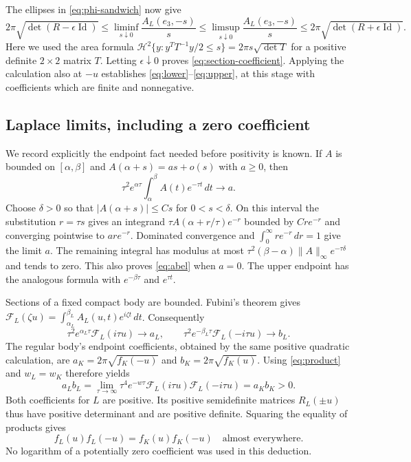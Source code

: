 \documentclass[11pt,a4paper]{article}
\theoremstyle{definition}
\theoremstyle{remark}
\newcommand{\area}{\mathcal H^2}
\newcommand{\F}{\mathcal F}
\newcommand{\id}{\operatorname{Id}}
\numberwithin{equation}{section}
\begin{document}
The ellipses in \eqref{eq:phi-sandwich} now give
\[
 2\pi\sqrt{\det(R-\epsilon\id)}
 \le \liminf_{s\downarrow0}\frac{A_L(e_3,-s)}s
 \le \limsup_{s\downarrow0}\frac{A_L(e_3,-s)}s
 \le2\pi\sqrt{\det(R+\epsilon\id)} .
\]
Here we used the area formula
$\area\{y:y^TT^{-1}y/2\le s\}=2\pi s\sqrt{\det T}$
for a positive definite $2\times2$ matrix $T$.
Letting $\epsilon\downarrow0$ proves \eqref{eq:section-coefficient}.
Applying the calculation also at $-u$ establishes
\eqref{eq:lower}--\eqref{eq:upper}, at this stage with coefficients
which are finite and nonnegative.

\subsection{Laplace limits, including a zero coefficient}\label{app:laplace}
We record explicitly the endpoint fact needed before positivity is known.
If $A$ is bounded on $[\alpha,\beta]$ and
$A(\alpha+s)=as+o(s)$ with $a\ge0$, then
\begin{equation}\label{eq:abel}
 \tau^2 e^{\alpha\tau}
 \int_\alpha^\beta A(t)e^{-\tau t}\,dt\longrightarrow a .
\end{equation}
Choose $\delta>0$ so that $|A(\alpha+s)|\le Cs$ for $0<s<\delta$.
On this interval the substitution $r=\tau s$ gives an integrand
$\tau A(\alpha+r/\tau)e^{-r}$ bounded by $Cr e^{-r}$ and converging
pointwise to $ar e^{-r}$. Dominated convergence and
$\int_0^\infty re^{-r}\,dr=1$ give the limit $a$. The remaining
integral has modulus at most
$\tau^2(\beta-\alpha)\|A\|_\infty e^{-\tau\delta}$ and tends to zero.
This also proves \eqref{eq:abel} when $a=0$.
The upper endpoint has the analogous formula with $e^{-\beta\tau}$
and $e^{\tau t}$.

Sections of a fixed compact body are bounded. Fubini's theorem gives
$\F_L(\zeta u)=\int_{\alpha_L}^{\beta_L}A_L(u,t)e^{i\zeta t}\,dt$.
Consequently
\begin{equation}\label{eq:scaled-laplace}
 \tau^2e^{\alpha_L\tau}\F_L(i\tau u)\to a_L,\qquad
 \tau^2e^{-\beta_L\tau}\F_L(-i\tau u)\to b_L.
\end{equation}
The regular body's endpoint coefficients, obtained by the same positive
quadratic calculation, are
$a_K=2\pi\sqrt{f_K(-u)}$ and $b_K=2\pi\sqrt{f_K(u)}$.
Using \eqref{eq:product} and $w_L=w_K$ therefore yields
\begin{equation}\label{eq:slopes-product}
 a_Lb_L
 =\lim_{\tau\to\infty}\tau^4e^{-w\tau}
                  \F_L(i\tau u)\F_L(-i\tau u)
 =a_Kb_K>0 .
\end{equation}
Both coefficients for $L$ are positive. Its positive semidefinite
matrices $R_L(\pm u)$ thus have positive determinant and are positive
definite. Squaring the equality of products gives
\begin{equation}\label{eq:density-product}
 f_L(u)f_L(-u)=f_K(u)f_K(-u)\quad\text{almost everywhere}.
\end{equation}
No logarithm of a potentially zero coefficient was used in this deduction.
\end{document}
